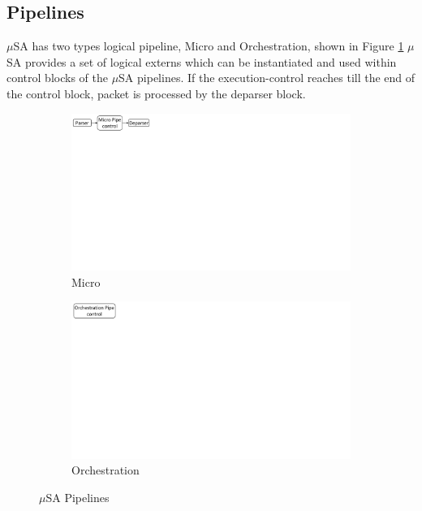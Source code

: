 \documentclass{hotnets19}
\begin{document}
\subsection{Pipelines}
\label{subsection:pipelines}
$\mu$SA has two types logical pipeline, Micro and Orchestration, shown in Figure \ref{fig:msa-pipelines}
$\mu$SA provides a set of logical externs which can be instantiated and used within control blocks of the $\mu$SA pipelines.
If the execution-control reaches till the end of the control block, packet is processed by the deparser block.
\begin{figure}
    \centering
    \begin{subfigure}{0.59\linewidth}
        \centering
        \includegraphics[trim=0 482 692 0, clip,scale=0.45]{msa-pipeline}
        \caption{Micro}
    \end{subfigure}\vline
    \begin{subfigure}{0.41\linewidth}
        \centering
        \includegraphics[trim=0 480 805 0,clip,scale=0.45]{micro-orchestration-pipeline}
        \caption{Orchestration}
    \end{subfigure}
\caption{$\mu$SA Pipelines}
\label{fig:msa-pipelines}
\end{figure}
\end{document}
